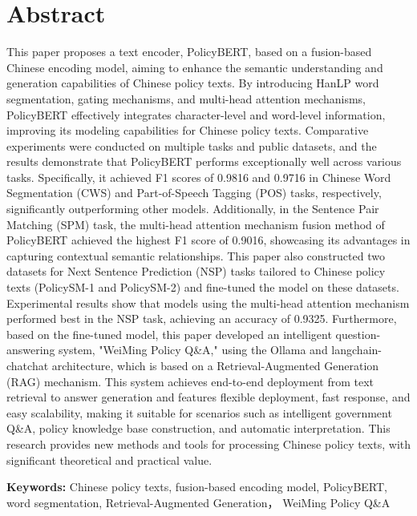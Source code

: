 \documentclass[12pt, a4paper]{ctexart}
\begin{document}
\section*{Abstract}
This paper proposes a text encoder, PolicyBERT, based on a fusion-based Chinese encoding model, aiming to enhance the semantic understanding and generation capabilities of Chinese policy texts. By introducing HanLP word segmentation, gating mechanisms, and multi-head attention mechanisms, PolicyBERT effectively integrates character-level and word-level information, improving its modeling capabilities for Chinese policy texts. Comparative experiments were conducted on multiple tasks and public datasets, and the results demonstrate that PolicyBERT performs exceptionally well across various tasks. Specifically, it achieved F1 scores of 0.9816 and 0.9716 in Chinese Word Segmentation (CWS) and Part-of-Speech Tagging (POS) tasks, respectively, significantly outperforming other models. Additionally, in the Sentence Pair Matching (SPM) task, the multi-head attention mechanism fusion method of PolicyBERT achieved the highest F1 score of 0.9016, showcasing its advantages in capturing contextual semantic relationships. This paper also constructed two datasets for Next Sentence Prediction (NSP) tasks tailored to Chinese policy texts (PolicySM-1 and PolicySM-2) and fine-tuned the model on these datasets. Experimental results show that models using the multi-head attention mechanism performed best in the NSP task, achieving an accuracy of 0.9325. Furthermore, based on the fine-tuned model, this paper developed an intelligent question-answering system, "WeiMing Policy Q\&A," using the Ollama and langchain-chatchat architecture, which is based on a Retrieval-Augmented Generation (RAG) mechanism. This system achieves end-to-end deployment from text retrieval to answer generation and features flexible deployment, fast response, and easy scalability, making it suitable for scenarios such as intelligent government Q\&A, policy knowledge base construction, and automatic interpretation. This research provides new methods and tools for processing Chinese policy texts, with significant theoretical and practical value.



\vspace{2em} %

\textbf{Keywords:} Chinese policy texts, fusion-based encoding model, PolicyBERT, word segmentation, Retrieval-Augmented Generation， WeiMing Policy Q\&A

\newpage
\renewcommand{\cfttoctitlefont}{\hfill\Huge\bfseries} %
\renewcommand{\cftaftertoctitle}{\hfill} %
\tableofcontents %
\thispagestyle{fancy}
\newpage
\end{document}
